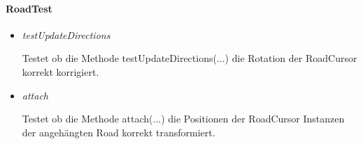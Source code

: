 \paragraph{RoadTest}
\begin{itemize}
	\item \textit{testUpdateDirections}
        \begin{leftbar}[0.9\linewidth]
			Testet ob die Methode testUpdateDirections(...) die Rotation der RoadCursor korrekt korrigiert.
		\end{leftbar}
	\item \textit{attach}
        \begin{leftbar}[0.9\linewidth]
			Testet ob die Methode attach(...) die Positionen der RoadCursor Instanzen der
			angehängten Road korrekt transformiert.
		\end{leftbar}
\end{itemize}

